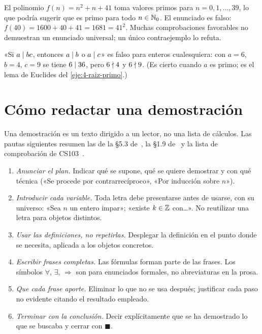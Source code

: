 \begin{ejemplo}\label{ej:euler}
El polinomio $f(n)=n^{2}+n+41$ toma valores primos para $n=0,1,\dots,39$, lo que podría sugerir que es primo para todo $n\in\mathbb{N}_0$. El enunciado es falso: $f(40)=1600+40+41=1681=41^{2}$. Muchas comprobaciones favorables no demuestran un enunciado universal; un único contraejemplo lo refuta.
\end{ejemplo}

\begin{ejemplo}\label{ej:divide-producto}
«Si $a\mid bc$, entonces $a\mid b$ o $a\mid c$» es falso para enteros cualesquiera: con $a=6$, $b=4$, $c=9$ se tiene $6\mid 36$, pero $6\nmid 4$ y $6\nmid 9$. (Es cierto cuando $a$ es primo; es el lema de Euclides del \cref{eje:4-raiz-primo}.)
\end{ejemplo}

\section{Cómo redactar una demostración}

Una demostración es un texto dirigido a un lector, no una lista de cálculos. Las pautas siguientes resumen las de la §5.3 de~\cite{hammack}, la §1.9 de~\cite{mcs} y la lista de comprobación de CS103~\cite{cs103}.

\begin{enumerate}[label=\arabic*.]
  \item \emph{Anunciar el plan.} Indicar qué se supone, qué se quiere demostrar y con qué técnica («Se procede por contrarrecíproco», «Por inducción sobre $n$»).
  \item \emph{Introducir cada variable.} Toda letra debe presentarse antes de usarse, con su universo: «Sea $n$ un entero impar»; «existe $k\in\mathbb{Z}$ con\dots». No reutilizar una letra para objetos distintos.
  \item \emph{Usar las definiciones, no repetirlas.} Desplegar la definición en el punto donde se necesita, aplicada a los objetos concretos.
  \item \emph{Escribir frases completas.} Las fórmulas forman parte de las frases. Los símbolos $\forall$, $\exists$, $\Rightarrow$ son para enunciados formales, no abreviaturas en la prosa.
  \item \emph{Que cada frase aporte.} Eliminar lo que no se usa después; justificar cada paso no evidente citando el resultado empleado.
  \item \emph{Terminar con la conclusión.} Decir explícitamente que se ha demostrado lo que se buscaba y cerrar con $\blacksquare$.
\end{enumerate}

